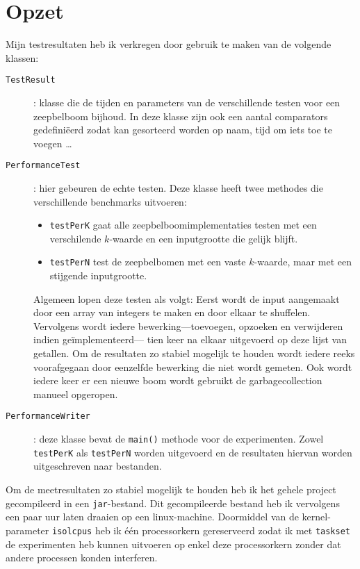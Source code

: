 \documentclass[12pt,hidelinks]{article}
\begin{document}
    \section*{Opzet}
    Mijn testresultaten heb ik verkregen door gebruik te maken van de volgende klassen:
    \begin{description}
        \item[\tt TestResult]: klasse die de tijden en parameters van de verschillende testen voor een zeepbelboom bijhoud.
            In deze klasse zijn ook een aantal comparators gedefiniëerd zodat kan gesorteerd worden op naam, tijd om iets toe te voegen \ldots
        \item[\tt PerformanceTest]: hier gebeuren de echte testen. 
            Deze klasse heeft twee methodes die verschillende benchmarks uitvoeren:
            \begin{itemize}
                \item {\tt testPerK} gaat alle zeepbelboomimplementaties testen met een verschilende $k$-waarde en een inputgrootte die gelijk blijft.
                \item {\tt testPerN} test de zeepbelbomen met een vaste $k$-waarde, maar met een stijgende inputgrootte.
            \end{itemize}
            Algemeen lopen deze testen als volgt: Eerst wordt de input aangemaakt door een array van integers te maken en door elkaar te shuffelen.
            Vervolgens wordt iedere bewerking---toevoegen, opzoeken en verwijderen indien geïmplementeerd--- tien keer na elkaar uitgevoerd op deze lijst van getallen.
            Om de resultaten zo stabiel mogelijk te houden wordt iedere reeks voorafgegaan door eenzelfde bewerking die niet wordt gemeten.
            Ook wordt iedere keer er een nieuwe boom wordt gebruikt de garbagecollection manueel opgeropen.
        \item[\tt PerformanceWriter]: deze klasse bevat de {\tt main()} methode voor de experimenten. Zowel {\tt testPerK} als {\tt testPerN} worden uitgevoerd en de resultaten hiervan worden uitgeschreven naar bestanden.
    \end{description}
    Om de meetresultaten zo stabiel mogelijk te houden heb ik het gehele project gecompileerd in een {\tt jar}-bestand.
    Dit gecompileerde bestand heb ik vervolgens een paar uur laten draaien op een linux-machine.
    Doormiddel van de kernel-parameter {\tt isolcpus} heb ik één processorkern gereserveerd zodat ik met {\tt taskset} de experimenten heb kunnen uitvoeren op enkel deze processorkern zonder dat andere processen konden interferen.
\end{document}
